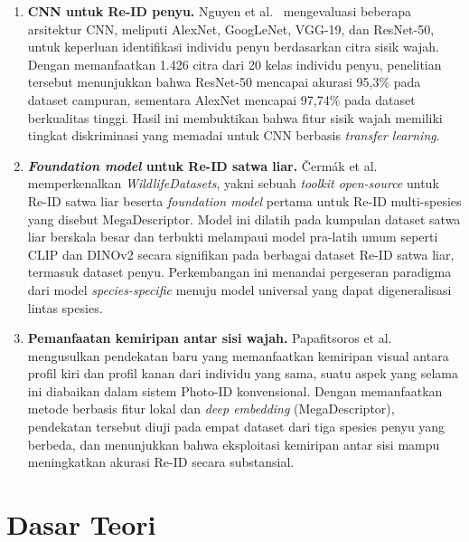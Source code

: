 \begin{enumerate}
\item \textbf{CNN untuk Re-ID penyu.}
Nguyen et al.\ \cite{nguyen2023cnn} mengevaluasi beberapa arsitektur CNN, meliputi AlexNet, GoogLeNet, VGG-19, dan ResNet-50, untuk keperluan identifikasi individu penyu berdasarkan citra sisik wajah. Dengan memanfaatkan 1.426 citra dari 20 kelas individu penyu, penelitian tersebut menunjukkan bahwa ResNet-50 mencapai akurasi 95{,}3\% pada dataset campuran, sementara AlexNet mencapai 97{,}74\% pada dataset berkualitas tinggi. Hasil ini membuktikan bahwa fitur sisik wajah memiliki tingkat diskriminasi yang memadai untuk CNN berbasis \textit{transfer learning}.
 
\item \textbf{\textit{Foundation model} untuk Re-ID satwa liar.}
\v{C}erm\'{a}k et al.\ \cite{cermak2024wildlifedatasets} memperkenalkan \textit{WildlifeDatasets}, yakni sebuah \textit{toolkit open-source} untuk Re-ID satwa liar beserta \textit{foundation model} pertama untuk Re-ID multi-spesies yang disebut MegaDescriptor. Model ini dilatih pada kumpulan dataset satwa liar berskala besar dan terbukti melampaui model pra-latih umum seperti CLIP dan DINOv2 secara signifikan pada berbagai dataset Re-ID satwa liar, termasuk dataset penyu. Perkembangan ini menandai pergeseran paradigma dari model \textit{species-specific} menuju model universal yang dapat digeneralisasi lintas spesies.
 
\item \textbf{Pemanfaatan kemiripan antar sisi wajah.}
Papafitsoros et al.\ \cite{papafitsoros2024facial} mengusulkan pendekatan baru yang memanfaatkan kemiripan visual antara profil kiri dan profil kanan dari individu yang sama, suatu aspek yang selama ini diabaikan dalam sistem Photo-ID konvensional. Dengan memanfaatkan metode berbasis fitur lokal dan \textit{deep embedding} (MegaDescriptor), pendekatan tersebut diuji pada empat dataset dari tiga spesies penyu yang berbeda, dan menunjukkan bahwa eksploitasi kemiripan antar sisi mampu meningkatkan akurasi Re-ID secara substansial.
\end{enumerate}

\section{Dasar Teori}
